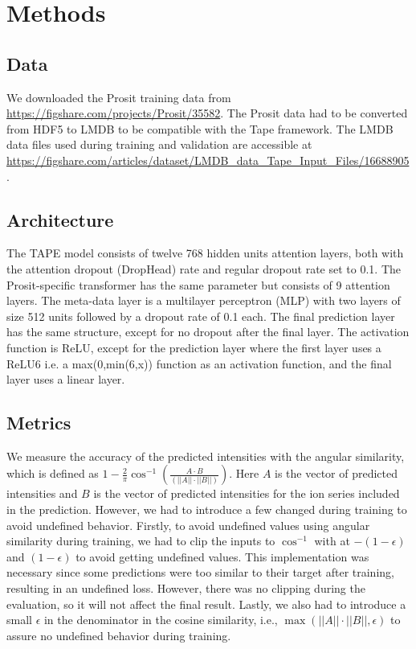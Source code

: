 \documentclass[10pt,a4paper]{article}
\begin{document}
\section*{Methods}
\subsection*{Data}
We downloaded the Prosit training data from \url{https://figshare.com/projects/Prosit/35582}. The Prosit data had to be converted from HDF5 to LMDB to be compatible with the Tape framework. The LMDB data files used during training and validation are accessible at \url{https://figshare.com/articles/dataset/LMDB_data_Tape_Input_Files/16688905}.

\subsection*{Architecture}

The TAPE model consists of twelve 768 hidden units attention layers, both with the attention dropout (DropHead) rate \cite{Zhou2020-ji} and regular dropout rate set to 0.1. The Prosit-specific transformer has the same parameter but consists of 9 attention layers. The meta-data layer is a multilayer perceptron (MLP) with two layers of size 512 units followed by a dropout rate of 0.1 each. The final prediction layer has the same structure, except for no dropout after the final layer.  The activation function is ReLU, except for the prediction layer where the first layer uses a ReLU6 \cite{Howard2017-yv} i.e. a max(0,min(6,x)) function as an activation function, and the final layer uses a linear layer.

\subsection*{Metrics}

We measure the accuracy of the predicted intensities with the angular similarity, which is defined as $1-\frac{2}{\pi} \cos^{-1}\left(\frac{A \cdot B}{(||A||\cdot||B||)}\right)$. Here $A$ is the vector of predicted intensities and $B$ is the vector of predicted intensities for the ion series included in the prediction. However, we had to introduce a few changed during training to avoid undefined behavior. Firstly, to avoid undefined values using angular similarity during training, we had to clip the inputs to $\cos^{-1}$ with at $-(1-\epsilon)$ and $(1-\epsilon)$ to avoid getting undefined values. This implementation was necessary since some predictions were too similar to their target after training, resulting in an undefined loss. However, there was no clipping during the evaluation, so it will not affect the final result. Lastly, we also had to introduce a small $\epsilon$ in the denominator in the cosine similarity, i.e., $\max(||A||·||B||, \epsilon)$ to assure no undefined behavior during training.
\end{document}
